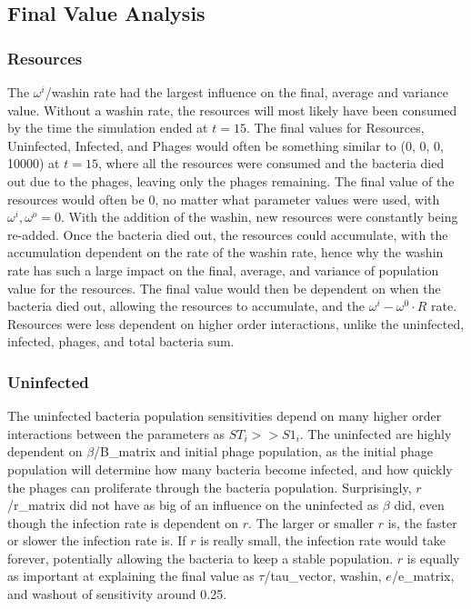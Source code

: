 \subsection{Final Value Analysis}
\subsubsection{Resources}
The $\omega^i$/washin rate had the largest influence on the final, average and variance value. 
Without a washin rate, the resources will most likely have been consumed by the time the simulation ended at $t=15$. 
The final values for Resources, Uninfected, Infected, and Phages would often be something similar to (0, 0, 0, 10000) at $t=15$, where all the resources were consumed and the bacteria died out due to the phages, leaving only the phages remaining. 
The final value of the resources would often be 0, no matter what parameter values were used, with $\omega^i, \omega^o = 0$. 
With the addition of the washin, new resources were constantly being re-added. 
Once the bacteria died out, the resources could accumulate, with the accumulation dependent on the rate of the washin rate, hence why the washin rate has such a large impact on the final, average, and variance of population value for the resources. 
The final value would then be dependent on when the bacteria died out, allowing the resources to accumulate, and the $\omega^i - \omega^0\cdot R$ rate. 
Resources were less dependent on higher order interactions, unlike the uninfected, infected, phages, and total bacteria sum. 

\subsubsection{Uninfected}
The uninfected bacteria population sensitivities depend on many higher order interactions between the parameters as $ST_i >> S1_i$. 
The uninfected are highly dependent on $\beta$/B\_matrix and initial phage population, as the initial phage population will determine how many bacteria become infected, and how quickly the phages can proliferate through the bacteria population. 
Surprisingly, $r$/r\_matrix did not have as big of an influence on the uninfected as $\beta$ did, even though the infection rate is dependent on $r$. 
The larger or smaller $r$ is, the faster or slower the infection rate is. If $r$ is really small, the infection rate would take forever, potentially allowing the bacteria to keep a stable population. 
$r$ is equally as important at explaining the final value as $\tau$/tau\_vector, washin, $e$/e\_matrix, and washout of sensitivity around 0.25. 

